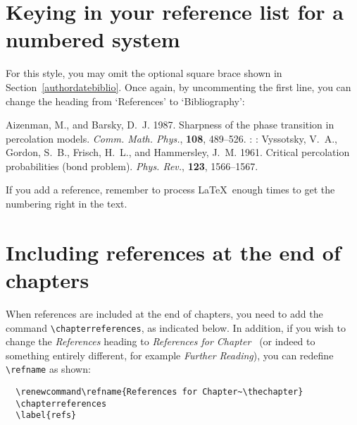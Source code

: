 \section{Keying in your reference list for a numbered system}

For this style, you may omit the optional square brace shown
in Section~\ref{authordatebiblio}. Once again, by uncommenting the first line,
you can change the heading from `References' to `Bibliography':
%
\begin{smallverbatim}
  \begin{thebibliography}{8}

    Aizenman, M., and Barsky, D.~J. 1987.
    Sharpness of the phase transition in percolation models.
    {\em Comm. Math. Phys.}, {\bf 108}, 489--526.
      :
      :
    Vyssotsky, V.~A., Gordon, S.~B., Frisch, H.~L., and Hammersley, J.~M. 1961.
    Critical percolation probabilities (bond problem).
    {\em Phys. Rev.}, {\bf 123}, 1566--1567.

  \end{thebibliography}
\end{smallverbatim}

If you add a reference, remember to process \LaTeX\ enough times to get the numbering right in the text.

\section{Including references at the end of chapters}
\label{chapref}

When references are included at the end of chapters, you need to add the command \verb"\chapterreferences", as indicated below. 
In addition, if you wish to change the \textit{References} heading to \textit{References for 
Chapter~\thechapter} (or indeed to something entirely different,
for example \textit{Further Reading}), you can redefine \verb"\refname" as shown:
\begin{verbatim}
  \renewcommand\refname{References for Chapter~\thechapter}
  \chapterreferences
  \label{refs}
  
\end{verbatim}

  \renewcommand\refname{References for Chapter~\thechapter}
  \chapterreferences
  \label{refs}
  


